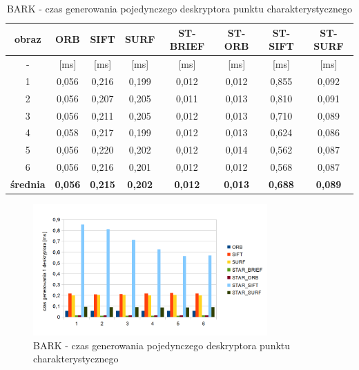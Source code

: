 \begin{table}[htbp]
  \centering
  \caption{BARK - czas generowania pojedynczego deskryptora punktu charakterystycznego}
    \begin{tabular}{|c|c|c|c|c|c|c|c|}\hline

    obraz & \textbf{ORB} & \textbf{SIFT} & \textbf{SURF} & \textbf{ST-BRIEF} & \textbf{ST-ORB} & \textbf{ST-SIFT} & \textbf{ST-SURF} \\\hline

    - & [ms] & [ms] & [ms] & [ms] & [ms] & [ms] & [ms] \\\hline
    1 & 0,056 & 0,216 & 0,199 & 0,012 & 0,012 & 0,855 & 0,092 \\
    2 & 0,056 & 0,207 & 0,205 & 0,011 & 0,013 & 0,810 & 0,091 \\
    3 & 0,056 & 0,211 & 0,205 & 0,012 & 0,013 & 0,710 & 0,089 \\
    4 & 0,058 & 0,217 & 0,199 & 0,012 & 0,013 & 0,624 & 0,086 \\
    5 & 0,056 & 0,220 & 0,202 & 0,012 & 0,014 & 0,562 & 0,087 \\
    6 & 0,056 & 0,216 & 0,201 & 0,012 & 0,012 & 0,568 & 0,087 \\\hline
    \textbf{średnia} & \textbf{0,056} & \textbf{0,215} & \textbf{0,202} & \textbf{0,012} & \textbf{0,013} & \textbf{0,688} & \textbf{0,089} \\\hline

    \end{tabular}%
  \label{tab:bark_f3}%
\end{table}%


\begin{figure}
\centering
\includegraphics[width=0.8\textwidth]{pict/mikolajczyk/bark/f3.png}
\caption{BARK - czas generowania pojedynczego deskryptora punktu charakterystycznego}
\label{fig:bark_f3}
\end{figure}


